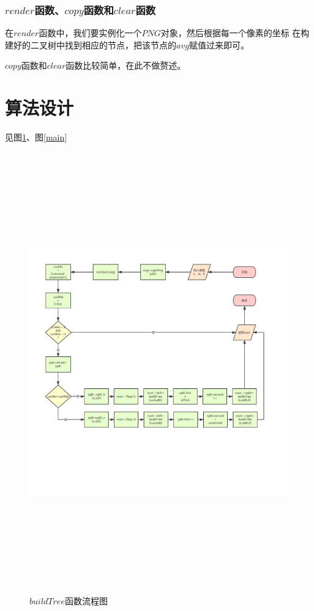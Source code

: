\documentclass[UTF8]{ctexart}
\begin{document}
		\subsubsection{$render$函数、$copy$函数和$clear$函数}
		\indent 在$render$函数中，我们要实例化一个$PNG$对象，然后根据每一个像素的坐标	在构建好的二叉树中找到相应的节点，把该节点的$avg$赋值过来即可。
		
		\indent $copy$函数和$clear$函数比较简单，在此不做赘述。	
	
	\section{算法设计}
	见图\ref{buildTree}、图\ref{main}


\begin{figure}[H]
	\centering 
	\includegraphics[width=20cm, height=19cm]{buildTree.pdf} 
	\caption{$buildTree$函数流程图} 
	\label{buildTree}
\end{figure}
\end{document}
